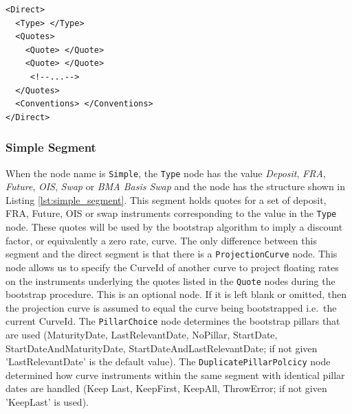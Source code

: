 \begin{listing}[H]
\begin{verbatim}
<Direct>
  <Type> </Type>
  <Quotes>
    <Quote> </Quote>
    <Quote> </Quote>
     <!--...-->
  </Quotes>
  <Conventions> </Conventions>
</Direct>
\end{verbatim}
\caption{Direct yield curve segment}
\label{lst:direct_segment}
\end{listing}


\subsubsection*{Simple Segment}
When the node name is \lstinline!Simple!, the \lstinline!Type! node has the value \emph{Deposit}, \emph{FRA},
\emph{Future}, \emph{OIS}, \emph{Swap} or \emph{BMA Basis Swap} and the node has the structure shown in Listing
\ref{lst:simple_segment}. This segment holds quotes for a set of deposit, FRA, Future, OIS or swap instruments
corresponding to the value in the \lstinline!Type! node. These quotes will be used by the bootstrap algorithm to imply a
discount factor, or equivalently a zero rate, curve. The only difference between this segment and the direct segment is
that there is a \lstinline!ProjectionCurve! node. This node allows us to specify the CurveId of another curve to project
floating rates on the instruments underlying the quotes listed in the \lstinline!Quote! nodes during the bootstrap
procedure. This is an optional node. If it is left blank or omitted, then the projection curve is assumed to equal the
curve being bootstrapped i.e.\ the current CurveId. The \lstinline!PillarChoice! node determines the bootstrap pillars
that are used (MaturityDate, LastRelevantDate, NoPillar, StartDate, StartDateAndMaturityDate,
StartDateAndLastRelevantDate; if not given 'LastRelevantDate' is the default
value). The \lstinline!DuplicatePillarPolcicy! node determined how curve instruments within the same segment with
identical pillar dates are handled (Keep Last, KeepFirst, KeepAll, ThrowError; if not given 'KeepLast' is used).

